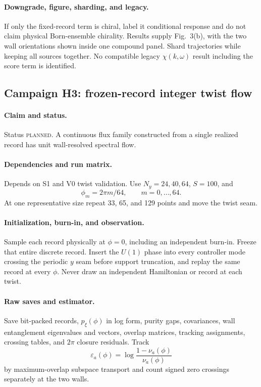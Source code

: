 \documentclass[aps,prx,onecolumn,nofootinbib,superscriptaddress,longbibliography]{revtex4-2}
\newcommand{\planned}{\textsc{planned}}
\begin{document}
\paragraph{Downgrade, figure, sharding, and legacy.}
If only the fixed-record term is chiral, label it conditional response and do not claim
physical Born-ensemble chirality.  Results supply Fig.~3(b), with the two wall
orientations shown inside one compound panel.  Shard trajectories while
keeping all sources together.  No compatible legacy $\chi(k,\omega)$ result including the
score term is identified.

\subsection{Campaign H3: frozen-record integer twist flow}
\paragraph{Claim and status.}
Status \planned.  A continuous flux family constructed from a single realized record has
unit wall-resolved spectral flow.

\paragraph{Dependencies and run matrix.}
Depends on S1 and V0 twist validation.  Use $N_y=24,40,64$, $S=100$, and
\begin{equation}
 \phi_m=2\pi m/64,\qquad m=0,\ldots,64.
\end{equation}
At one representative size repeat 33, 65, and 129 points and move the twist seam.

\paragraph{Initialization, burn-in, and observation.}
Sample each record physically at $\phi=0$, including an independent burn-in.  Freeze that
entire discrete record.  Insert the $U(1)$ phase into every controller mode crossing the
periodic $y$ seam before support truncation, and replay the same record at every $\phi$.
Never draw an independent Hamiltonian or record at each twist.

\paragraph{Raw saves and estimator.}
Save bit-packed records, $p_\xi(\phi)$ in log form, purity gaps, covariances, wall
entanglement eigenvalues and vectors, overlap matrices, tracking assignments, crossing
tables, and $2\pi$ closure residuals.  Track
\begin{equation}
 \varepsilon_a(\phi)=\log\frac{1-\nu_a(\phi)}{\nu_a(\phi)}
\end{equation}
by maximum-overlap subspace transport and count signed zero crossings separately at the two
walls.
\end{document}
